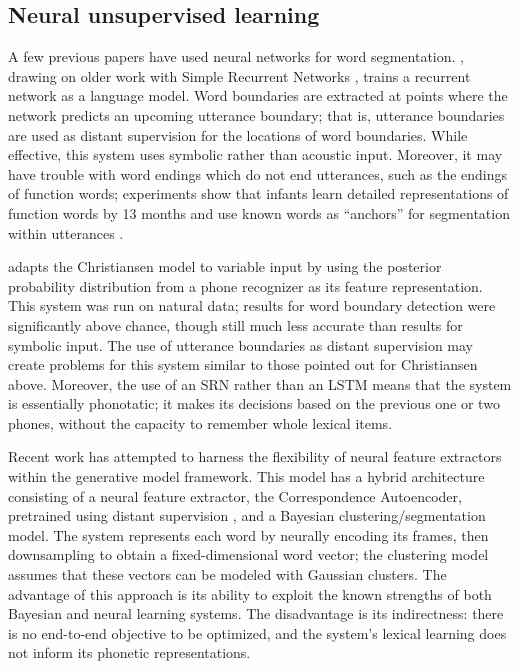 \documentclass[11pt,letterpaper]{article}
\begin{document}
\subsection{Neural unsupervised learning}
\label{sub-neural}

A few previous papers have used neural networks for word
segmentation. , drawing on older work with
Simple Recurrent Networks \cite{Elman90}, trains a recurrent network as
a language model. Word boundaries are extracted at points where the
network predicts an upcoming utterance boundary; that is, utterance
boundaries are used as distant supervision for the locations of word
boundaries. While effective, this system uses symbolic rather than
acoustic input. Moreover, it may have trouble with word endings which
do not end utterances, such as the endings of function words;
experiments show that infants learn detailed representations of
function words by 13 months \cite{Shi06} and use known words as
``anchors'' for segmentation within utterances \cite{Bortfeld05}.

 adapts the Christiansen model to variable input by
using the posterior probability distribution from a phone recognizer
as its feature representation. This system was run on natural data;
results for word boundary detection were significantly above chance,
though still much less accurate than results for symbolic input. The
use of utterance boundaries as distant supervision may create problems
for this system similar to those pointed out for Christiansen
above. Moreover, the use of an SRN rather than an LSTM means that the
system is essentially phonotatic; it makes its decisions based on the
previous one or two phones, without the capacity to remember whole
lexical items.

Recent work \cite{Kamper16} has attempted to harness the flexibility
of neural feature extractors within the generative model
framework. This model has a hybrid architecture consisting of a neural
feature extractor, the Correspondence Autoencoder, pretrained using
distant supervision \cite{Kamper15}, and a Bayesian
clustering/segmentation model. The system represents each word by
neurally encoding its frames, then downsampling to obtain a
fixed-dimensional word vector; the clustering model assumes that these
vectors can be modeled with Gaussian clusters. The advantage of this
approach is its ability to exploit the known strengths of both
Bayesian and neural learning systems. The disadvantage is its
indirectness: there is no end-to-end objective to be optimized, and
the system's lexical learning does not inform its phonetic
representations.
\end{document}
